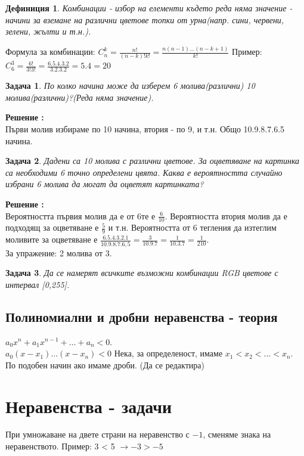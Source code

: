 \documentclass{article}
\newtheorem{definition}{Дефиниция}
\newtheorem{problem}{Задача}
\newcounter{solution}
\newcommand\solution{%
	\stepcounter{solution}%
	\textbf{Решение :}\\%
}
\begin{document}
\begin{definition}
	Комбинации - избор на елементи където реда няма значение - начини за вземане на различни цветове топки от урна(напр. сини, червени, зелени, жълти и т.н.).
\end{definition}
Формула за комбинации:
$C_n^k = \frac{n!}{(n-k)!k!} = \frac{n(n-1)...(n-k+1)}{k!} $
Пример: \\
$C_6^3 = \frac{6!}{3!3!} = \frac{6.5.4.3.2}{3.2.3.2} = 5.4 = 20 $
\begin{problem}
По колко начина може да изберем 6 молива(различни) 10 молива(различни)?(Реда няма значение).
\end{problem}
\solution Първи молив избираме по 10 начина, втория - по 9, и т.н. Общо 10.9.8.7.6.5 начина.



\begin{problem}
	Дадени са 10 молива с различни цветове. За оцветяване на картинка са необходими 6 точно определени цвята. Каква е вероятността случайно избрани 6 молива да могат да оцветят картинката?
\end{problem}
\solution
Вероятността първия молив да е от 6те е $\frac{6}{10}$. Вероятността втория молив да е подходящ за оцветяване е  $\frac{5}{9}$ и т.н. Вероятността от 6 тегления да изтеглим моливите за оцветяване е $\frac{6.5.4.3.2.1}{10.9.8.7.6,5} = \frac{3}{10.9.7} = \frac{1}{10.3.7} = \frac{1}{210}$. \\
За упражение: 2 молива от 3.



\begin{problem}
	Да се намерят всичките възможни комбинации RGB цветове с интервал [0,255].
\end{problem}

\subsection{Полиномиални и дробни неравенства - теория}
$a_0 x^n + a_1 x^{n-1} + \dots  + a_n < 0$. \\
$a_0(x-x_1)\dots (x-x_n) < 0$
Нека, за определеност, имаме $x_1 < x_2 < \dots < x_n $. По подобен начин ако имаме дроби. (Да се редактира)

	\section{Неравенства - задачи}
	При умножаване на двете страни на неравенство с $-1$, сменяме знака на неравенството. Пример:
	 3 < 5  $ \to -3>-5 $ \\
	 
\end{document}

